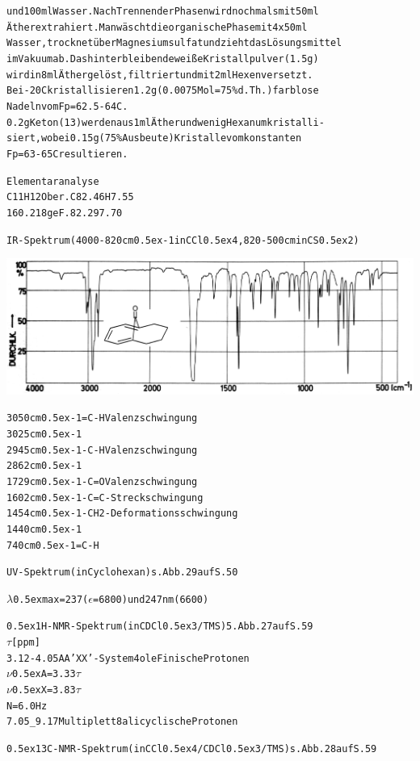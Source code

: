 \documentclass[a4paper,11pt]{article}
\begin{document}
\begin{alltt}
\newpage
{}


und 100 ml Wasser. Nach Trennen der Phasen wird nochmals mit 50 ml
Äther extrahiert. Man wäscht die organische Phase mit 4 x 50 ml
Wasser, trocknet über Magnesiumsulfat und zieht das Lösungsmittel
im Vakuum ab. Das hinterbleibende weiße Kristallpulver (1.5 g)
wird in 8 ml Äther gelöst, filtriert und mit 2 ml Hexen versetzt.
Bei -20\degree{}C kristallisieren 1.2 g (0.0075 Mol = 75 \% d.Th.) farblose
Nadeln vom Fp = 62.5 - 64\degree{}C.
0.2 g Keton (13) werden aus 1 ml Äther und wenig Hexan umkristalli-
siert, wobei 0.15 g (75 \% Ausbeute) Kristalle vom konstanten
Fp = 63 - 65\degree{}C resultieren.

Elementaranalyse
C11H12O ber. C 82.46 H 7.55
160.218 geF.   82.29   7.70

IR-Spektrum (4000-820 cm\raise0.5ex\hbox{-1} in CCl\lower0.5ex\hbox{4}, 820-500 cm in CS\lower0.5ex\hbox{2})
\end{alltt}
\hspace*{-0.5cm}\includegraphics[width=15.0cm]{IR_054}
\begin{alltt}

3050 cm\raise0.5ex\hbox{-1}  =C-H   Valenzschwingung
3025 cm\raise0.5ex\hbox{-1}
2945 cm\raise0.5ex\hbox{-1}  -C-H   Valenzschwingung
2862 cm\raise0.5ex\hbox{-1}
1729 cm\raise0.5ex\hbox{-1}  -C=O   Valenzschwingung
1602 cm\raise0.5ex\hbox{-1}  -C=C-  Streckschwingung
1454 cm\raise0.5ex\hbox{-1}  -CH2-  Deformationsschwingung
1440 cm\raise0.5ex\hbox{-1}
 740 cm\raise0.5ex\hbox{-1}  =C-H


\newpage
{}


UV-Spektrum (in Cyclohexan) s. Abb. 29 auf S. 50

\(\lambda\)\lower0.5ex\hbox{max} = 237 (\(\epsilon\) = 6800) und 247 nm (6600)


\leavevmode\raise0.5ex\hbox{1}H-NMR-Spektrum (in CDCl\lower0.5ex\hbox{3}/TMS) 5. Abb. 27 auf S. 59
  \(\tau\) [ppm]
3.12 - 4.05   AA'XX'-System    4 oleFinische Protonen
              \(\nu\)\lower0.5ex\hbox{A} = 3.33 \(\tau\)
              \(\nu\)\lower0.5ex\hbox{X} = 3.83 \(\tau\)
              N = 6.0 Hz
7.05 _ 9.17   Multiplett       8 alicyclische Protonen

\leavevmode\raise0.5ex\hbox{13}C-NMR-Spektrum (in CCl\lower0.5ex\hbox{4}/CDCl\lower0.5ex\hbox{3}/TMS) s. Abb. 28 auf S. 59
\end{alltt}
\end{document}
